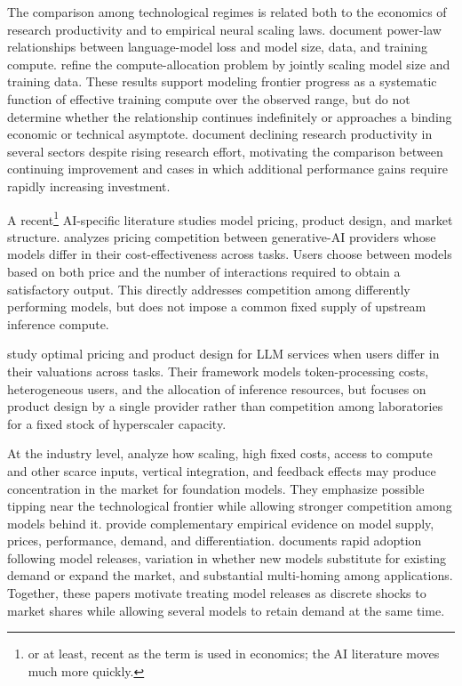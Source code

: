 \documentclass[11pt]{article}
\begin{document}
The comparison among technological regimes is related both to the economics of research productivity and to empirical neural scaling laws. \citet{kaplanEtAl2020} document power-law relationships between language-model loss and model size, data, and training compute. \citet{hoffmannEtAl2022} refine the compute-allocation problem by jointly scaling model size and training data. These results support modeling frontier progress as a systematic function of effective training compute over the observed range, but do not determine whether the relationship continues indefinitely or approaches a binding economic or technical asymptote. \citet{bloomEtAl2020} document declining research productivity in several sectors despite rising research effort, motivating the comparison between continuing improvement and cases in which additional performance gains require rapidly increasing investment.

A recent\footnote{or at least, recent as the term is used in economics; the AI literature moves much more quickly.} AI-specific literature studies model pricing, product design, and market structure. \citet{mahmood2024} analyzes pricing competition between generative-AI providers whose models differ in their cost-effectiveness across tasks. Users choose between models based on both price and the number of interactions required to obtain a satisfactory output. This directly addresses competition among differently performing models, but does not impose a common fixed supply of upstream inference compute.

\citet{bergemannBonattiSmolin2026} study optimal pricing and product design for LLM services when users differ in their valuations across tasks. Their framework models token-processing costs, heterogeneous users, and the allocation of inference resources, but focuses on product design by a single provider rather than competition among laboratories for a fixed stock of hyperscaler capacity.

At the industry level, \citet{korinekVipra2025} analyze how scaling, high fixed costs, access to compute and other scarce inputs, vertical integration, and feedback effects may produce concentration in the market for foundation models. They emphasize possible tipping near the technological frontier while allowing stronger competition among models behind it. \citet{demirerEtAl2025} provide complementary empirical evidence on model supply, prices, performance, demand, and differentiation. \citet{fradkin2025demand} documents rapid adoption following model releases, variation in whether new models substitute for existing demand or expand the market, and substantial multi-homing among applications. Together, these papers motivate treating model releases as discrete shocks to market shares while allowing several models to retain demand at the same time.
\end{document}

